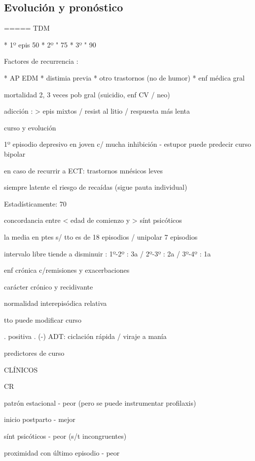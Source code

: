 \subsection*{Evolución y pronóstico}

===== TDM

* 1º epis 50%
* 2º " 75%
* 3º " 90 %

Factores de recurrencia :

* AP EDM
* distimia previa
* otro trastornos (no de humor)
* enf médica gral

mortalidad 2, 3 veces pob gral (suicidio, enf CV / neo)

adicción : > epis mixtos / resist al litio / respuesta más lenta

curso y evolución

1º episodio depresivo en joven c/ mucha inhibición - estupor puede predecir curso bipolar

en caso de recurrir a ECT: trastornos mnésicos leves

siempre latente el riesgo de recaídas (sigue pauta individual)

Estadísticamente: 70%

concordancia entre < edad de comienzo y > sínt psicóticos

la media en ptes s/ tto es de 18 episodios / unipolar 7 episodios

intervalo libre tiende a disminuir : 1º-2º : 3a / 2º-3º : 2a / 3º-4º : 1a

enf crónica c/remisiones y exacerbaciones

carácter crónico y recidivante

normalidad interepisódica relativa

tto puede modificar curso

. positiva
. (-) ADT: ciclación rápida / viraje a manía

predictores de curso

CLÍNICOS

CR

patrón estacional - peor (pero se puede instrumentar profilaxis)

inicio postparto - mejor

sínt psicóticos - peor (s/t incongruentes)

proximidad con último episodio - peor

